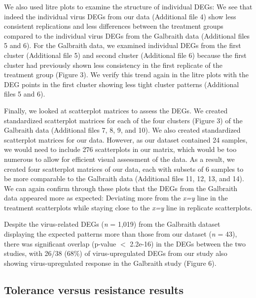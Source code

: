 \documentclass{bmcart}
\begin{document}
\begin{linenumbers}
\begin{doublespacing}
We also used litre plots to examine the structure of individual DEGs: We see that indeed the individual virus DEGs from our data (Additional file 4) show less consistent replications and less differences between the treatment groups compared to the individual virus DEGs from the Galbraith data (Additional files 5 and 6). For the Galbraith data, we examined individual DEGs from the first cluster (Additional file 5) and second cluster (Additional file 6) because the first cluster had previously shown less consistency in the first replicate of the treatment group (Figure 3). We verify this trend again in the litre plots with the DEG points in the first cluster showing less tight cluster patterns (Additional files 5 and 6).

Finally, we looked at scatterplot matrices to assess the DEGs. We created standardized scatterplot matrices for each of the four clusters (Figure 3) of the Galbraith data (Additional files 7, 8, 9, and 10). We also created standardized scatterplot matrices for our data. However, as our dataset contained 24 samples, we would need to include 276 scatterplots in our matrix, which would be too numerous to allow for efficient visual assessment of the data. As a result, we created four scatterplot matrices of our data, each with subsets of 6 samples to be more comparable to the Galbraith data (Additional files 11, 12, 13, and 14). We can again confirm through these plots that the DEGs from the Galbraith data appeared more as expected: Deviating more from the \textit{x=y} line in the treatment scatterplots while staying close to the \textit{x=y} line in replicate scatterplots.

Despite the virus-related DEGs (\textit{n} = 1,019) from the Galbraith dataset displaying the expected patterns more than those from our dataset (\textit{n} = 43), there was significant overlap (p-value $<$ 2.2e-16) in the DEGs between the two studies, with 26/38 (68\%) of virus-upregulated DEGs from our study also showing virus-upregulated response in the Galbraith study (Figure 6).

\subsection*{Tolerance versus resistance results}


\end{doublespacing}
\end{linenumbers}
\end{document}
